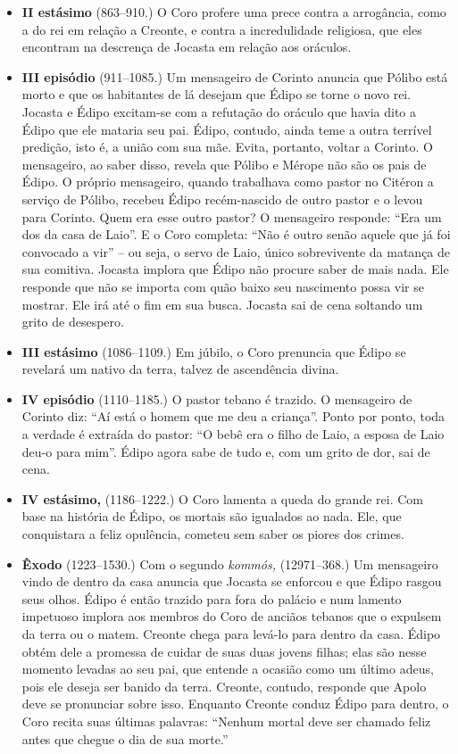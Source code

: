 \begin{itemize}
\item \textbf{II estásimo} (863--910.) O Coro profere uma prece
contra a arrogância, como a do rei em relação a Creonte, e contra a
incredulidade religiosa, que eles encontram na descrença de Jocasta em
relação aos oráculos.

\item \textbf{III episódio} (911--1085.) Um mensageiro de
Corinto anuncia que Pólibo está morto e que os habitantes de lá desejam
que Édipo se torne o novo rei. Jocasta e Édipo excitam-se com a
refutação do oráculo que havia dito a Édipo que ele mataria seu pai.
Édipo, contudo, ainda teme a outra terrível predição, isto é, a união
com sua mãe. Evita, portanto, voltar a Corinto. O mensageiro, ao saber
disso, revela que Pólibo e Mérope não são os pais de Édipo. O próprio
mensageiro, quando trabalhava como pastor no Citéron a serviço de
Pólibo, recebeu Édipo recém-nascido de outro pastor e o levou para
Corinto. Quem era esse outro pastor? O mensageiro responde: ``Era um dos
da casa de Laio''. E o Coro completa: ``Não é outro senão aquele que já
foi convocado a vir'' -- ou seja, o servo de Laio, único sobrevivente da
matança de sua comitiva. Jocasta implora que Édipo não procure saber de
mais nada. Ele responde que não se importa com quão baixo seu nascimento
possa vir se mostrar. Ele irá até o fim em sua busca. Jocasta sai de
cena soltando um grito de desespero.

\item \textbf{III estásimo} (1086--1109.) Em júbilo, o Coro
prenuncia que Édipo se revelará um nativo da terra, talvez de
ascendência divina.

\item \textbf{IV episódio} (1110--1185.) O pastor tebano é
trazido. O mensageiro de Corinto diz: ``Aí está o homem que me deu a
criança''. Ponto por ponto, toda a verdade é extraída do pastor: ``O
bebê era o filho de Laio, a esposa de Laio deu-o para mim''. Édipo agora
sabe de tudo e, com um grito de dor, sai de cena.

\item \textbf{IV estásimo,} (1186--1222.) O Coro lamenta a queda
do grande rei. Com base na história de Édipo, os mortais são igualados
ao nada. Ele, que conquistara a feliz opulência, cometeu sem saber os
piores dos crimes.

\item \textbf{Êxodo} (1223--1530.) Com o segundo \emph{kommós,}
(12971--368.) Um mensageiro vindo de dentro da casa anuncia que Jocasta
se enforcou e que Édipo rasgou seus olhos. Édipo é então trazido para
fora do palácio e num lamento impetuoso implora aos membros do Coro de
anciãos tebanos que o expulsem da terra ou o matem. Creonte chega para
levá-lo para dentro da casa. Édipo obtém dele a promessa de cuidar de
suas duas jovens filhas; elas são nesse momento levadas ao seu pai, que
entende a ocasião como um último adeus, pois ele deseja ser banido da
terra. Creonte, contudo, responde que Apolo deve se pronunciar sobre
isso. Enquanto Creonte conduz Édipo para dentro, o Coro recita suas
últimas palavras: ``Nenhum mortal deve ser chamado feliz antes que
chegue o dia de sua morte.''
\end{itemize}